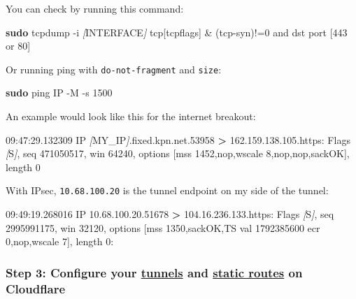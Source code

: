 \documentclass[
]{article}
\newenvironment{Shaded}{\begin{snugshade}}{\end{snugshade}}
\newcommand{\AttributeTok}[1]{\textcolor[rgb]{0.13,0.29,0.53}{#1}}
\newcommand{\ExtensionTok}[1]{#1}
\newcommand{\FunctionTok}[1]{\textcolor[rgb]{0.13,0.29,0.53}{\textbf{#1}}}
\newcommand{\NormalTok}[1]{#1}
\newcommand{\OperatorTok}[1]{\textcolor[rgb]{0.81,0.36,0.00}{\textbf{#1}}}
\newcommand{\PreprocessorTok}[1]{\textcolor[rgb]{0.56,0.35,0.01}{\textit{#1}}}
\newcommand{\SpecialStringTok}[1]{\textcolor[rgb]{0.31,0.60,0.02}{#1}}
\newcommand{\StringTok}[1]{\textcolor[rgb]{0.31,0.60,0.02}{#1}}
\begin{document}
You can check by running this command:

\begin{Shaded}
\begin{Highlighting}[numbers=left,,]
\FunctionTok{sudo}\NormalTok{ tcpdump }\AttributeTok{{-}i} \PreprocessorTok{[}\SpecialStringTok{INTERFACE}\PreprocessorTok{]} \StringTok{\textquotesingle{}tcp[tcpflags] \& (tcp{-}syn)!=0 and dst port [443 or 80]}
\end{Highlighting}
\end{Shaded}

Or running ping with \texttt{do-not-fragment} and \texttt{size}:

\begin{Shaded}
\begin{Highlighting}[numbers=left,,]
\FunctionTok{sudo}\NormalTok{ ping IP }\AttributeTok{{-}M} \AttributeTok{{-}s}\NormalTok{ 1500}
\end{Highlighting}
\end{Shaded}

An example would look like this for the internet breakout:

\begin{Shaded}
\begin{Highlighting}[numbers=left,,]
\ExtensionTok{09:47:29.132309}\NormalTok{ IP }\PreprocessorTok{[}\SpecialStringTok{MY\_IP}\PreprocessorTok{]}\NormalTok{.fixed.kpn.net.53958 }\OperatorTok{\textgreater{}}\NormalTok{ 162.159.138.105.https: Flags }\PreprocessorTok{[}\SpecialStringTok{S}\PreprocessorTok{]}\NormalTok{, seq 471050517, win 64240, options [mss 1452,nop,wscale 8,nop,nop,sackOK], length 0}
\end{Highlighting}
\end{Shaded}

With IPsec, \texttt{10.68.100.20} is the tunnel endpoint on my side of
the tunnel:

\begin{Shaded}
\begin{Highlighting}[numbers=left,,]
\ExtensionTok{09:49:19.268016}\NormalTok{ IP 10.68.100.20.51678 }\OperatorTok{\textgreater{}}\NormalTok{ 104.16.236.133.https: Flags }\PreprocessorTok{[}\SpecialStringTok{S}\PreprocessorTok{]}\NormalTok{, seq 2995991175, win 32120, options [mss 1350,sackOK,TS val 1792385600 ecr 0,nop,wscale 7], length 0:}
\end{Highlighting}
\end{Shaded}

\subsubsection{\texorpdfstring{Step 3: Configure your
\href{https://developers.cloudflare.com/magic-wan/configuration/manually/how-to/configure-tunnels/}{tunnels}
and
\href{https://developers.cloudflare.com/magic-wan/configuration/manually/how-to/configure-static-routes/}{static
routes} on
Cloudflare}{Step 3: Configure your tunnels and static routes on Cloudflare}}\label{step-3-configure-your-tunnels-and-static-routes-on-cloudflare}
\end{document}
